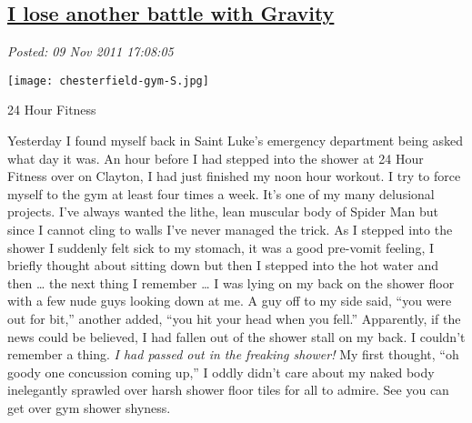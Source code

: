 %

\subsection*{\href{http://bakerjd99.wordpress.com/2011/11/09/i-lose-another-battle-with-gravity/}{I lose another battle with Gravity}}


\noindent\emph{Posted: 09 Nov 2011 17:08:05}
\vspace{6pt}


\captionsetup[floatingfigure]{labelformat=empty}
\begin{floatingfigure}[l]{0.30\textwidth}
\centering
{\texttt{[image: chesterfield-gym-S.jpg]}}
\caption{24 Hour  Fitness}
\label{fig:2045X0}
\end{floatingfigure}Yesterday I found myself back in Saint Luke's emergency department being
asked what day it was. An hour before I had stepped into the shower at
24 Hour Fitness over on Clayton, I had just finished my noon hour
workout. I try to force myself to the gym at least four times a week.
It's one of my many delusional projects. I've always wanted the lithe,
lean muscular body of Spider Man but since I cannot cling to walls I've
never managed the trick. As I stepped into the shower I suddenly felt
sick to my stomach, it was a good pre-vomit feeling, I briefly thought
about sitting down but then I stepped into the hot water and then
\ldots{} the next thing I remember \ldots{} I was lying on my back on
the shower floor with a few nude guys looking down at me. A guy off to
my side said, ``you were out for bit,'' another added, ``you hit your
head when you fell.'' Apparently, if the news could be believed, I had
fallen out of the shower stall on my back. I couldn't remember a thing.
\emph{I had passed out in the freaking shower!} My first thought, ``oh
goody one concussion coming up,'' I oddly didn't care about my naked
body inelegantly sprawled over harsh shower floor tiles for all to
admire. See you can get over gym shower shyness.

